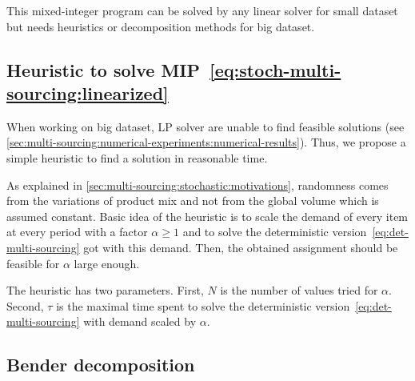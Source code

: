 This mixed-integer program can be solved by any linear solver for small dataset but needs heuristics or decomposition methods for big dataset.


\subsection{Heuristic to solve MIP~\eqref{eq:stoch-multi-sourcing:linearized}}


When working on big dataset, LP solver are unable to find feasible solutions (see \cref{sec:multi-sourcing:numerical-experiments:numerical-results}).
Thus, we propose a simple heuristic to find a solution in reasonable time.


As explained in \cref{sec:multi-sourcing:stochastic:motivations}, randomness comes from the variations of product mix and not from the global volume which is assumed constant.
Basic idea of the heuristic is to scale the demand of every item at every period with a factor $\alpha\ge1$ and to solve the deterministic version~\eqref{eq:det-multi-sourcing} got with this demand.
Then, the obtained assignment should be feasible for $\alpha$ large enough.


The heuristic has two parameters.
First, $N$ is the number of values tried for $\alpha$.
Second, $\tau$ is the maximal time spent to solve the deterministic version~\eqref{eq:det-multi-sourcing} with demand scaled by $\alpha$.







\subsection{Bender decomposition}


